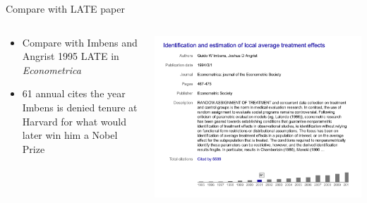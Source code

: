 \documentclass{beamer}
\begin{document}
\begin{frame}{Compare with LATE paper}
  \begin{columns}
    \begin{column}{0.5\textwidth}
      \begin{itemize}
\item Compare with Imbens and Angrist 1995 LATE in \emph{Econometrica}
\item 61 annual cites the year Imbens is denied tenure at Harvard for what would later win him a Nobel Prize
      \end{itemize}
    \end{column}
    \begin{column}{0.5\textwidth}
      \includegraphics[scale=0.25]{./lecture_includes/guido_late}
    \end{column}
  \end{columns}
\end{frame}
\end{document}

